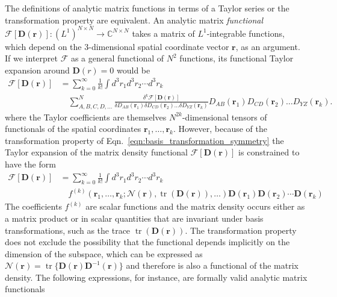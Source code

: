 \documentclass[journal=jpca,manuscript=article,layout=singlecolumn]{achemso}
\DeclareMathOperator{\tr}{tr}
\newcommand\m[1]{\mathbf{#1}}
\renewcommand\vec[1]{\mathbf{#1}}
\begin{document}
The definitions of analytic matrix functions in terms of a Taylor series or the transformation property are equivalent. \cite{Rinehart1955} 
An analytic matrix \emph{functional} $\m{\mathcal{F}}[\m{D}(\vec{r})] : (L^1)^{N \times N} \to \mathbb{C}^{N \times N}$ takes a matrix of $L^1$-integrable functions, which depend on the 3-dimensional spatial coordinate vector $\vec{r}$, as an argument.
If we interpret $\m{\mathcal{F}}$ as a general functional of $N^2$ functions, its functional Taylor expansion around $\m{D}(r) = 0$ would be
\begin{equation}
  \begin{split}
    \m{\mathcal{F}}[\m{D}(\vec{r})] & = \sum_{k=0}^{\infty} \frac{1}{k!} \int d^3\!r_1 d^3\!r_2 \cdots d^3\!r_k ~ \\
    & \quad \sum_{A,B,C,D,\ldots}^{N} \frac{\delta^{k} \m{\mathcal{F}}[\m{D}(\vec{r})]}{\delta D_{AB}(\vec{r}_1) \delta D_{CD}(\vec{r}_2) \ldots \delta D_{YZ}(\vec{r}_k)} D_{AB}(\vec{r}_1) D_{CD}(\vec{r}_2) \ldots D_{YZ}(\vec{r}_k).
  \end{split}
\end{equation}
where the Taylor coefficients are themselves $N^{2 k}$-dimensional tensors of functionals of the spatial coordinates $\vec{r}_1,\ldots,\vec{r}_k$.
However, because of the transformation property of Eqn.~\ref{eqn:basis_transformation_symmetry} the Taylor expansion of the matrix density functional
$\m{\mathcal{F}}[\m{D}(\vec{r})]$ is constrained to have the form
\begin{equation}
 \begin{split}
  \m{\mathcal{F}}[\m{D}(\vec{r})] &= \sum_{k=0}^{\infty} \frac{1}{k!} \int d^3\!r_1 d^3\!r_2 \cdots d^3\!r_k ~ \\
   & \quad f^{(k)}(\vec{r}_1,\ldots,\vec{r}_k; \mathcal{N}(\vec{r}), \tr(\m{D}(\vec{r})), \ldots) \m{D}(\vec{r}_1) \m{D}(\vec{r}_2) \cdots \m{D}(\vec{r}_k) \label{eqn:functional_taylor_expansion}
 \end{split}
\end{equation}
The coefficients $f^{(k)}$ are scalar functions and the matrix density occurs either as a matrix product or in scalar quantities that are invariant under basis transformations, such as the trace $\tr(\mathbf{D}(\vec{r}))$.
The transformation property does not exclude the possibility that the functional depends implicitly on the dimension of the subspace, which can be expressed as $\mathcal{N}(\vec{r}) = \tr\{\m{D}(\vec{r}) \m{D}^{-1}(\vec{r})\}$ and therefore is also a functional of the matrix density.
The following expressions, for instance, are formally valid analytic matrix functionals
\end{document}

